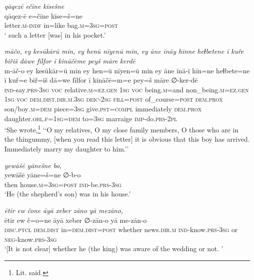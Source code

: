 \ea \label{KŠ.77}
\textit{qāqezē ečīne kīsešne} \\ 
\gll qāqez-ē e=čīne kīse=š=ne \\ 
 letter\textsc{.m}\textsc{-indf} in=like bag\textsc{.m}\textsc{=3sg}\textsc{=\textsc{post}} \\ 
\glt ` such a letter [was] in his pocket.'
\z 
 
\ea \label{KŠ.80}
\textit{māčo, ey kesūkārū min, ey henū nīyenū min, ey āne īnāy hīnne heɫbetene ī kuře biřiš dāwe fīlfor ī kināčēme peyš māre kerdē} \\ 
\gll m-āč-o ey kesūkār=ū min ey hen=ū nīyen=ū min ey āne īnā-ī hīn=ne heɫbete=ne ī kuř=e biř=iš dā=we fīlfor ī kināčē=m=e pey=š māre ∅-ker-dē \\ 
 \textsc{ind-}say\textsc{.prs}\textsc{-3sg} \textsc{voc} relative\textsc{.m}\textsc{\textsc{=ez.gen}} \textsc{1sg} \textsc{voc} being\textsc{.m}=and non\_being\textsc{.m}\textsc{\textsc{=ez.gen}} \textsc{1sg} \textsc{voc} \textsc{dem.dist}\textsc{.dir}\textsc{.m}\textsc{.3sg} \textsc{deic}-\textsc{2sg} \textsc{fill}\textsc{=\textsc{post}} of\_course\textsc{=\textsc{post}} \textsc{dem.prox} son/boy\textsc{.m}\textsc{=dem} piece\textsc{=3sg} give\textsc{.pst}\textsc{=compl} immediately \textsc{dem.prox} daughter\textsc{.obl}\textsc{.f}\textsc{=\textsc{1sg}}\textsc{=dem} to\textsc{=3sg} marraige \textsc{imp-}do\textsc{.prs}-\textsc{2pl} \\ 
\glt `She wrote,\footnote{Lit. said.} ‘‘O my relatives, O my close family members, O those who are in the thingummy, [when you read this letter] it is obvious that this boy has arrived. Immediately marry my daughter to him.’'
\z 
 
\ea \label{KŠ.90}
\textit{yewāšē yānešne bo,} \\ 
\gll yewāšē yāne=š=ne ∅-b-o \\ 
 then house\textsc{.m}\textsc{=3sg}\textsc{=\textsc{post}} \textsc{ind-}be\textsc{.prs}\textsc{-3sg} \\ 
\glt `He (the shepherd’s son) was in his house.'
\z 
 
\ea \label{KŠ.91}
\textit{ētir ew čone āyā xeber zāno yā mezāno,} \\ 
\gll ētir ew č=o=ne āyā xeber ∅-zān-o yā me-zān-o \\ 
 \textsc{disc.ptcl} \textsc{dem.dist} in=\textsc{dem.dist}\textsc{=\textsc{post}} whether news\textsc{.dir}\textsc{.m} \textsc{ind-}know\textsc{.prs}\textsc{-3sg} or \textsc{neg-}know\textsc{.prs}\textsc{-3sg} \\ 
\glt `[It is not clear] whether he (the king) was aware of the wedding or not. '
\z 
 
